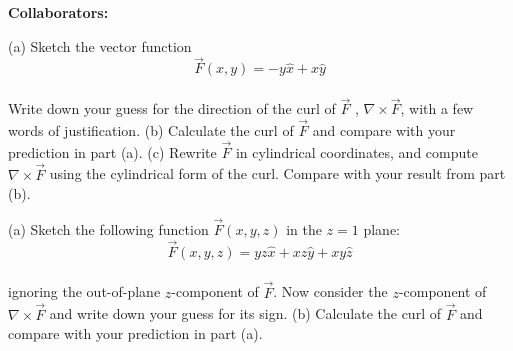 \documentclass[11pt,letterpaper,boxed]{hmcpset}
\begin{document}
	
	\noindent\textbf{Collaborators:} 
	
	
	\begin{problem}  (a) Sketch the vector function $$\Vec{F}(x,y) = -y\hat{x} + x\hat{y}$$ \\
Write down your guess for the direction of the curl of $\vec{F}$ , $\nabla \times \vec{F}$, with a few words of justification.
(b) Calculate the curl of $\vec{F}$ and compare with your prediction in part (a).
(c) Rewrite $\vec{F}$ in cylindrical coordinates, and compute $\nabla \times \vec{F}$ using the cylindrical form of the curl.
Compare with your result from part (b).
		
	\end{problem}
	
	\begin{solution}
		\vfill
	\end{solution}
	\newpage

	\begin{problem} (a) Sketch the following function $\vec{F}(x,y,z)$ in the $z = 1$ plane:
$$\vec{F}(x,y,z) = yz\hat{x} + xz\hat{y} + xy\hat{z}$$ \\
ignoring the out-of-plane $z$-component of $\vec{F}$. Now consider the $z$-component of $\nabla \times \vec{F}$ and write down your guess for its sign.
(b) Calculate the curl of $\vec{F}$ and compare with your prediction in part (a).
	\end{problem}
	\begin{solution}
		\vfill
	\end{solution}
	\newpage
	
\end{document}
